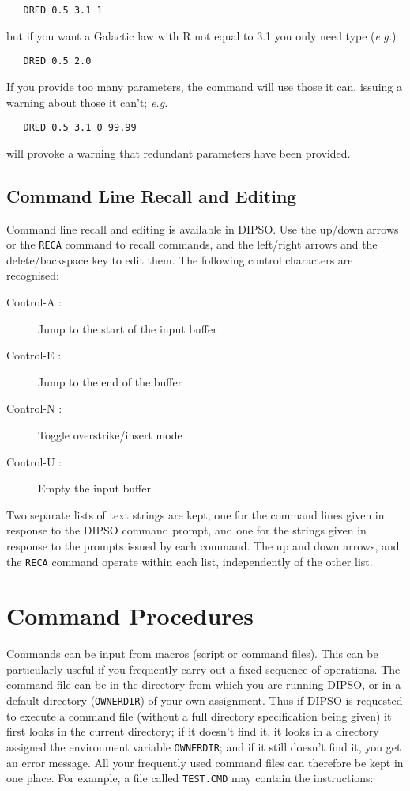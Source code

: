 \documentclass[twoside,11pt]{article}
\newcommand{\htmlref}[2]{#1}
\renewcommand{\_}{\texttt{\symbol{95}}}
\newenvironment{dipdesc}{\begin{description}}{\end{description}}
\newcommand{\dipitem}[2]{ \item[{#1}] {#2} }
\newenvironment{dipdesc}{\begin{itemize}}{\end{itemize}}
\newcommand{\dipitem}[2]{ \item {\bf{#1}} {#2} }
\begin{document}
\begin{verbatim}
   DRED 0.5 3.1 1
\end{verbatim}

but if you want a Galactic law with R not equal to 3.1 you only need
type ({\em e.g.})

\begin{verbatim}
   DRED 0.5 2.0
\end{verbatim}

If you provide too many parameters, the command will use those it can,
issuing a warning about those it can't; {\em e.g.}

\begin{verbatim}
   DRED 0.5 3.1 0 99.99
\end{verbatim}

will provoke a warning that redundant parameters have been provided.

\subsection{Command Line Recall and Editing}
Command line recall and editing is available in DIPSO. Use the up/down
arrows or the \htmlref{{\tt{RECA}}}{COM:RECA}  command to recall commands, and the left/right
arrows and the delete/backspace key to edit them. The following control
characters are recognised:

\begin{dipdesc}
\dipitem {Control-A :}{ Jump to the start of the input buffer }
\dipitem {Control-E :}{ Jump to the end of the buffer }
\dipitem {Control-N :}{ Toggle overstrike/insert mode }
\dipitem {Control-U :}{ Empty the input buffer}
\end{dipdesc}

Two separate lists of text strings are kept; one for the command lines
given in response to the DIPSO command prompt, and one for the strings
given in response to the prompts issued by each command. The up and down
arrows, and the \htmlref{{\tt{RECA}}}{COM:RECA}  command operate within each list, independently
of the other list.

\section {Command Procedures}

Commands can be input from macros (script or command files). This can
be particularly useful if you frequently carry out a fixed sequence of
operations. The command file can be in the directory from which you
are running DIPSO, or in a default directory ({\tt{OWNERDIR}})  of your own
assignment. Thus if DIPSO is requested to execute a command file
(without a full directory specification being given) it first looks in
the current directory; if it doesn't find it, it looks in a directory
assigned the environment variable {\tt{OWNERDIR}};  and if it
still doesn't find it, you get an error message. All your frequently
used command files can therefore be kept in one place. For example, a
file called {\tt{TEST.CMD}}  may contain the instructions:
\end{document}

